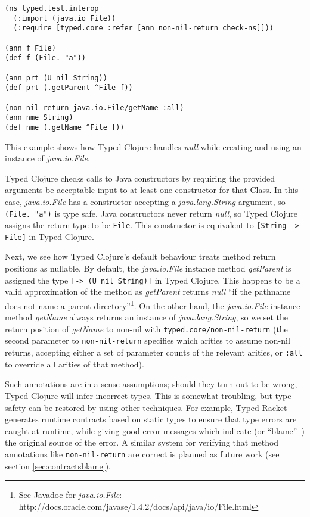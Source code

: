 \begin{lstlisting}[caption=Java interoperability with Typed Clojure]
(ns typed.test.interop
  (:import (java.io File))
  (:require [typed.core :refer [ann non-nil-return check-ns]]))

(ann f File)
(def f (File. "a"))

(ann prt (U nil String))
(def prt (.getParent ^File f))

(non-nil-return java.io.File/getName :all)
(ann nme String)
(def nme (.getName ^File f))

\end{lstlisting}

This example shows how Typed Clojure handles \emph{null} while creating and
using an instance of \emph{java.io.File}.

Typed Clojure checks calls to Java constructors by requiring the provided
arguments be acceptable input to at least one constructor for that Class.
In this case, \emph{java.io.File} has a constructor accepting a \emph{java.lang.String}
argument, so \lstinline|(File. "a")| is type safe. Java constructors never
return \emph{null}, so Typed Clojure assigns the return type to be \lstinline|File|.
This constructor is equivalent to \lstinline|[String -> File]| in Typed Clojure.

Next, we see how Typed Clojure's default behaviour treats method return positions as nullable.
By default, the \emph{java.io.File} instance method \emph{getParent}
is assigned the type \lstinline|[-> (U nil String)]| in Typed Clojure. This happens to be
a valid approximation of the method as \emph{getParent} returns \emph{null} 
``if the pathname does not name a parent directory''\footnote{See Javadoc for \emph{java.io.File}: http://docs.oracle.com/javase/1.4.2/docs/api/java/io/File.html}.
On the other hand, the \emph{java.io.File} instance method \emph{getName} always returns an
instance of \emph{java.lang.String}, so we set the return position of
\emph{getName} to non-nil with \lstinline|typed.core/non-nil-return|
(the second parameter to \lstinline|non-nil-return| specifies which arities to assume non-nil 
returns, accepting either a set of parameter counts of the relevant arities, or \lstinline|:all|
to override all arities of that method).

Such annotations are in a sense assumptions; should they turn out to be wrong, Typed Clojure
will infer incorrect types. 
This is somewhat troubling, but type safety can be restored by using other techniques.
For example, Typed Racket generates runtime contracts based on static types to ensure
that type errors are caught at runtime, while giving good error messages 
which indicate (or ``blame''~\cite{WF09}) the original source of the error.
A similar system for verifying that method annotations like \lstinline|non-nil-return|
are correct is planned as future work
(see section \ref{sec:contractsblame}).
